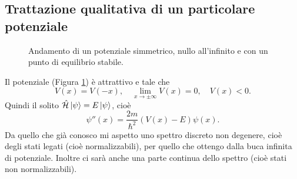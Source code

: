 \subsection{Trattazione qualitativa di un particolare potenziale}
\begin{figure}
\centering
{}
\caption{Andamento di un potenziale simmetrico, nullo all'infinito e con un punto di equilibrio stabile.}
\label{particolare}
\end{figure}
Il potenziale (Figura \ref{particolare}) è attrattivo e tale che
\[
V(x) = V(-x), \quad \lim_{x \to \pm \infty} V(x) = 0, \quad V(x) < 0.
\]
Quindi il solito \( \hat{\mathcal{H}} \ket{\psi} = E \ket{\psi} \), cioè 
\[
\psi''(x) = \frac{2m}{\hbar^2} \left( V(x) - E \right) \psi(x).
\]
Da quello che già conosco mi aspetto uno spettro discreto non degenere, cioè degli stati legati (cioè normalizzabili), per quello che ottengo dalla buca infinita di potenziale. Inoltre ci sarà anche una parte continua dello spettro (cioè stati non normalizzabili).

